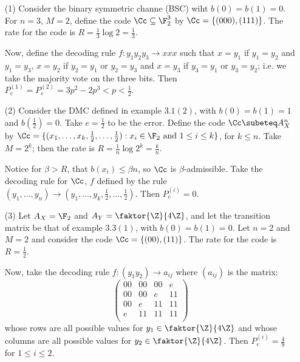 \begin{example}
    \begin{enumerate}
        \item[(1)] Consider the binary symmetric channe (BSC) wiht
            $b(0)=b(1)=0$. For $n=3$,  $M=2$, define the code  $\Cc \subseteq
            \F_2^3$ by  $\Cc=\{(000),(111)\}$. The rate for the code is
            $R=\frac{1}{3}\log{2}=\frac{1}{3}$.

            Now, define the decoding rule $f:y_1y_2y_3 \rightarrow xxx$ such
            that $x=y_1$ if $y_1=y_2$ and $y_1=y_3$, $x=y_2$ if $y_2=y_1$ or
            $y_2=y_3$ and $x=y_3$ if  $y_3=y_1$ or $y_3=y_2$; i.e. we take the
            majority vote on the three bits. Then
            $P_e^{(1)}=P_e^{(2)}=3p^2-2p^3<p<\frac{1}{2}$.

        \item[(2)] Consider the DMC defined in example $3.1(2)$, with
            $b(0)=b(1)=1$ and $b(\frac{1}{2})=0$. Take $e=\frac{1}{2}$ to be the
            error. Define the code $\Cc \subeteq A_X^n$ by  $\Cc=\{(x_1, \dots,
            x_k, \frac{1}{2}, \dots, \frac{1}{2}) : x_i \in \F_2 \text{ and } 1
            \leq i \leq k\}$, for $k \leq n$. Take  $M=2^k$; then the rate is
            $R=\frac{1}{n}\log{2^k}=\frac{k}{n}$.

            Notice for $\beta > R$, that  $b(x_i) \leq \beta n$, so $\Cc$ is
            $\beta$-admissible. Take the decoding rule for  $\Cc$, $f$ defined by
            the rule  $(y_1, \dots, y_n) \rightarrow (y_1, \dots, y_k, \frac{1}{2},
            \dots, \frac{1}{2})$. Then $P_e^{(i)}=0$.

        \item[(3)] Let $A_X=\F_2$ and  $A_Y=\faktor{\Z}{4\Z}$, and let the
            transition matrix be that of example $3.3(1)$, with $b(0)=b(1)=0$.
            Let $n=2$ and  $M=2$ and consider the code  $\Cc=\{(00),(11)\}$. The
            rate for the code is $R=\frac{1}{2}$.

            Now, take the decoding rule $f:(y_1y_2) \rightarrow a_{ij}$ where
            $(a_{ij})$ is the matrix:
            \begin{equation*}
                \begin{pmatrix}
                    00  &   00  &   00  &   e   \\
                    00  &   00  &   e   &   11  \\
                    00  &   e   &   11  &   11  \\
                    e   &   11  &   11  &   11  \\
                \end{pmatrix}
            \end{equation*}
            whose rows are all possible values for $y_1 \in \faktor{\Z}{4\Z}$
            and whose columns are all possible values for $y_2 \in
            \faktor{\Z}{4\Z}$. Then $P_e^{(i)}=\frac{4}{9}$ for $1 \leq i \leq
            2$.
    \end{enumerate}
\end{example}


